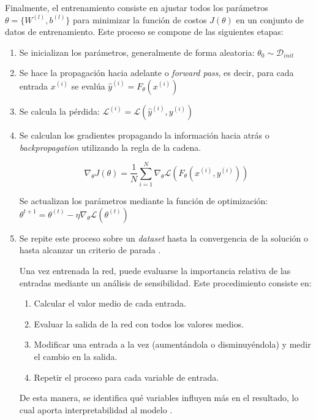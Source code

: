 Finalmente, el entrenamiento consiste en ajustar todos los parámetros $\theta = \{ W^{(l)}, b^{(l)}\}$ para minimizar la función de costos $J(\theta)$ en un conjunto de datos de entrenamiento. Este proceso se compone de las siguientes etapas:

\begin{enumerate}
	
	\item Se inicializan los parámetros, generalmente de forma aleatoria: $\theta_0 \sim \mathcal{D}_{init}$

	\item Se hace la propagación hacia adelante o \textit{forward pass}, es decir, para cada entrada $x^{(i)}$ se evalúa $\hat{y}^{(i)} = F_\theta(x^{(i)})$ 

	\item Se calcula la pérdida: $\mathcal{L}^{(i)} = \mathcal{L}(\hat{y}^{(i)}, y^{(i)})$
	
	\item Se calculan los gradientes propagando la información hacia atrás o \textit{backpropagation} utilizando la regla de la cadena.
	
	\[
	\nabla_\theta J(\theta) = \frac{1}{N} \sum_{i = 1}^{N} \nabla_\theta \mathcal{L} (F_ \theta(x^{(i)}, y ^{(i)}))
	\]

	Se actualizan los parámetros mediante la función de optimización: $\theta^{t + 1} = \theta^{(t)} - \eta  \nabla_\theta \mathcal{L}(\theta^{(t)})$

	\item Se repite este proceso sobre un \textit{dataset} hasta la convergencia de la solución o hasta alcanzar un criterio de parada \cite{ann_3}.
	
	Una vez entrenada la red, puede evaluarse la importancia relativa de las entradas mediante un análisis de sensibilidad. Este procedimiento consiste en:
	
	\begin{enumerate}
		\item Calcular el valor medio de cada entrada.
		\item Evaluar la salida de la red con todos los valores medios.
		\item Modificar una entrada a la vez (aumentándola o disminuyéndola) y medir el cambio en la salida.
		\item Repetir el proceso para cada variable de entrada.
	\end{enumerate}
	
	De esta manera, se identifica qué variables influyen más en el resultado, lo cual aporta interpretabilidad al modelo \cite{ann_extra}.
	
\end{enumerate}

